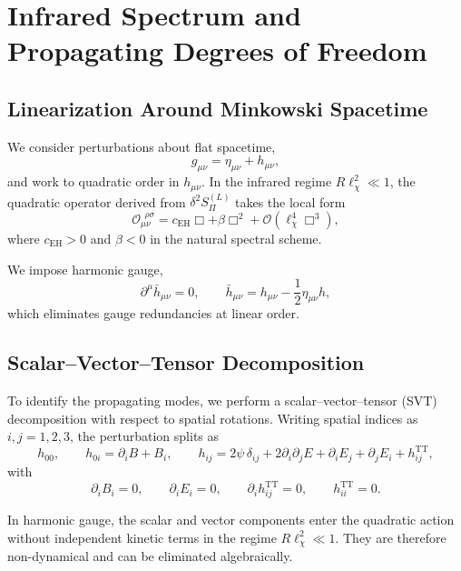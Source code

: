 \section{Infrared Spectrum and Propagating Degrees of Freedom}
  \label{sec:ir_spectrum}

  \subsection{Linearization Around Minkowski Spacetime}
    \label{subsec:linearization-around-minkowski-spacetime}

    We consider perturbations about flat spacetime,
    \[
      g_{\mu\nu}
      =
      \eta_{\mu\nu}
      +
      h_{\mu\nu},
    \]
    and work to quadratic order in $h_{\mu\nu}$.
    In the infrared regime
    $R\ell_\chi^2 \ll 1$,
    the quadratic operator derived from
    $\delta^2 S_\Pi^{(L)}$
    takes the local form
    \[
      \mathcal{O}_{\mu\nu}^{\ \ \rho\sigma}
      =
      c_{\mathrm{EH}}\Box
      +
      \beta \Box^2
      +
      \mathcal{O}(\ell_\chi^4 \Box^3),
    \]
    where $c_{\mathrm{EH}}>0$ and $\beta<0$ in the natural spectral scheme.

    We impose harmonic gauge,
    \[
      \partial^\mu \bar h_{\mu\nu}
      =
      0,
      \qquad
      \bar h_{\mu\nu}
      =
      h_{\mu\nu}
      -
      \frac12 \eta_{\mu\nu} h,
    \]
    which eliminates gauge redundancies at linear order.

  \subsection{Scalar--Vector--Tensor Decomposition}
    \label{subsec:scalar--vector--tensor-decomposition}

    To identify the propagating modes, we perform a
    scalar--vector--tensor (SVT) decomposition with respect to spatial
    rotations.
    Writing spatial indices as $i,j=1,2,3$, the perturbation splits as
    \[
      h_{00},
      \qquad
      h_{0i} = \partial_i B + B_i,
      \qquad
      h_{ij}
      =
      2\psi\,\delta_{ij}
      +
      2\partial_i\partial_j E
      +
      \partial_i E_j
      +
      \partial_j E_i
      +
      h^{\mathrm{TT}}_{ij},
    \]
    with
    \[
      \partial_i B_i = 0,
      \qquad
      \partial_i E_i = 0,
      \qquad
      \partial_i h^{\mathrm{TT}}_{ij} = 0,
      \qquad
      h^{\mathrm{TT}}_{ii} = 0.
    \]

    In harmonic gauge, the scalar and vector components enter the quadratic
    action without independent kinetic terms in the regime
    $R\ell_\chi^2 \ll 1$.
    They are therefore non-dynamical and can be eliminated algebraically.

